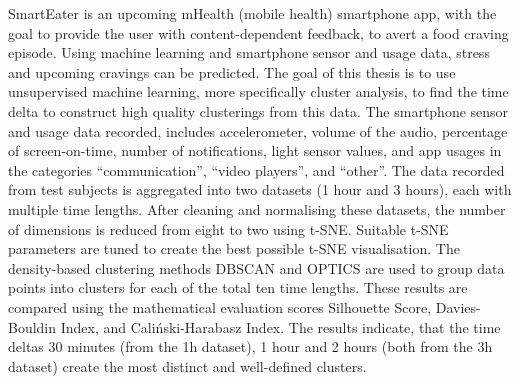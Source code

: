 SmartEater is an upcoming mHealth (mobile health) smartphone app, with the goal to provide the user with content-dependent feedback, to avert a food craving episode. Using machine learning and  smartphone sensor and usage data, stress and upcoming cravings can be predicted. The goal of this thesis is to use unsupervised machine learning, more specifically cluster analysis, to find the time delta to construct high quality clusterings from this data. The smartphone sensor and usage data recorded, includes accelerometer, volume of the audio, percentage of screen-on-time, number of notifications, light sensor values, and app usages in the categories “communication”, “video players”, and “other”. The data recorded from test subjects is aggregated into two datasets (1 hour and 3 hours), each with multiple time lengths. After cleaning and normalising these datasets, the number of dimensions is reduced from eight to two using t-SNE. Suitable t-SNE parameters are tuned to create the best possible t-SNE visualisation. The density-based clustering methods DBSCAN and OPTICS are used to group data points into clusters for each of the total ten time lengths. These results are compared using the mathematical evaluation scores Silhouette Score, Davies-Bouldin Index, and Caliński-Harabasz Index. The results indicate, that the time deltas 30 minutes (from the 1h dataset), 1 hour and 2 hours (both from the 3h dataset) create the most distinct and well-defined clusters.
